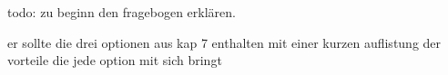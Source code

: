 todo: zu beginn den fragebogen erklären.

er sollte die drei optionen aus kap 7 enthalten mit einer kurzen auflistung der vorteile die jede option mit sich bringt